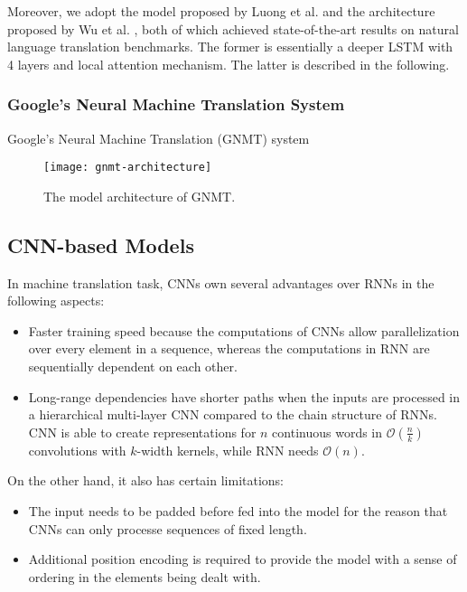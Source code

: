Moreover, we adopt the model proposed by Luong et al. \cite{Luong2015} and the architecture proposed by Wu et al. \cite{Wu2016}, both of which achieved state-of-the-art results on natural language translation benchmarks. The former is essentially a deeper LSTM with 4 layers and local attention mechanism. The latter is described in the following.

\subsubsection*{Google's Neural Machine Translation System}

Google's Neural Machine Translation (GNMT) system \cite{Wu2016} 

\begin{figure}[h]
\texttt{[image: gnmt-architecture]}
\centering
\caption{The model architecture of GNMT.}
\label{figure:gnmt architecture}
\end{figure}

\subsection{CNN-based Models} \label{subsection:cnn-based models}

In machine translation task, CNNs own several advantages over RNNs in the following aspects:
\begin{itemize}
\item Faster training speed because the computations of CNNs allow parallelization over every element in a sequence, whereas the computations in RNN are sequentially dependent on each other.
\item Long-range dependencies have shorter paths when the inputs are processed in a hierarchical multi-layer CNN compared to the chain structure of RNNs. CNN is able to create representations for $ n $ continuous words in $ \mathcal{O}(\frac{n}{k}) $ convolutions with $ k $-width kernels, while RNN needs $ \mathcal{O}(n) $.
\end{itemize}
On the other hand, it also has certain limitations:
\begin{itemize}
\item The input needs to be padded before fed into the model for the reason that CNNs can only processe sequences of fixed length.
\item Additional position encoding is required to provide the model with a sense of ordering in the elements being dealt with.
\end{itemize}

